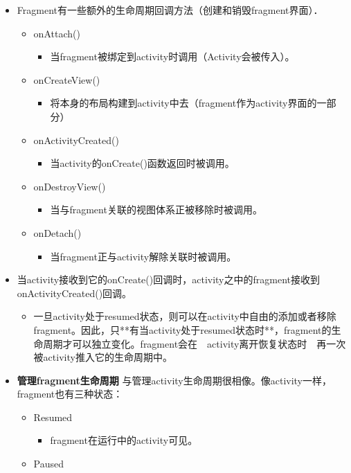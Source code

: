 \documentclass[9pt, b5paper]{article}
\begin{document}
\begin{itemize}
\item Fragment有一些额外的生命周期回调方法（创建和销毁fragment界面）．
\begin{itemize}
\item onAttach()
\begin{itemize}
\item 当fragment被绑定到activity时调用（Activity会被传入）。
\end{itemize}
\item onCreateView()
\begin{itemize}
\item 将本身的布局构建到activity中去（fragment作为activity界面的一部分）
\end{itemize}
\item onActivityCreated()
\begin{itemize}
\item 当activity的onCreate()函数返回时被调用。
\end{itemize}
\item onDestroyView()
\begin{itemize}
\item 当与fragment关联的视图体系正被移除时被调用。
\end{itemize}
\item onDetach()
\begin{itemize}
\item 当fragment正与activity解除关联时被调用。
\end{itemize}
\end{itemize}
\item 当activity接收到它的onCreate()回调时，activity之中的fragment接收到onActivityCreated()回调。
\begin{itemize}
\item 一旦activity处于resumed状态，则可以在activity中自由的添加或者移除fragment。因此，只**有当activity处于resumed状态时**，fragment的生命周期才可以独立变化。fragment会在　activity离开恢复状态时　再一次被activity推入它的生命周期中。
\end{itemize}
\item \textbf{管理fragment生命周期} 与管理activity生命周期很相像。像activity一样，fragment也有三种状态：
\begin{itemize}
\item Resumed
\begin{itemize}
\item fragment在运行中的activity可见。
\end{itemize}
\item Paused

\end{itemize}
\end{itemize}
\end{document}
